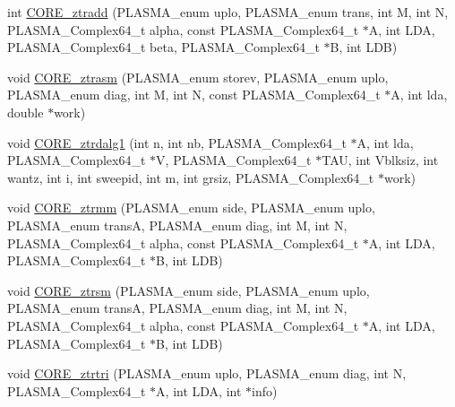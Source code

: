 \begin{DoxyCompactItemize}
\item 
int \hyperlink{group__CORE__PLASMA__Complex64__t_ga12adea0eb1121a4d2c668f344fc7aeca_ga12adea0eb1121a4d2c668f344fc7aeca}{C\+O\+R\+E\+\_\+ztradd} (P\+L\+A\+S\+M\+A\+\_\+enum uplo, P\+L\+A\+S\+M\+A\+\_\+enum trans, int M, int N, P\+L\+A\+S\+M\+A\+\_\+\+Complex64\+\_\+t alpha, const P\+L\+A\+S\+M\+A\+\_\+\+Complex64\+\_\+t $\ast$A, int L\+D\+A, P\+L\+A\+S\+M\+A\+\_\+\+Complex64\+\_\+t beta, P\+L\+A\+S\+M\+A\+\_\+\+Complex64\+\_\+t $\ast$B, int L\+D\+B)
\item 
void \hyperlink{group__CORE__PLASMA__Complex64__t_ga2d04c482383fc87daa3da97d2407f31a_ga2d04c482383fc87daa3da97d2407f31a}{C\+O\+R\+E\+\_\+ztrasm} (P\+L\+A\+S\+M\+A\+\_\+enum storev, P\+L\+A\+S\+M\+A\+\_\+enum uplo, P\+L\+A\+S\+M\+A\+\_\+enum diag, int M, int N, const P\+L\+A\+S\+M\+A\+\_\+\+Complex64\+\_\+t $\ast$A, int lda, double $\ast$work)
\item 
void \hyperlink{group__CORE__PLASMA__Complex64__t_ga480ae84e836404a6e258922643414be5_ga480ae84e836404a6e258922643414be5}{C\+O\+R\+E\+\_\+ztrdalg1} (int n, int nb, P\+L\+A\+S\+M\+A\+\_\+\+Complex64\+\_\+t $\ast$A, int lda, P\+L\+A\+S\+M\+A\+\_\+\+Complex64\+\_\+t $\ast$V, P\+L\+A\+S\+M\+A\+\_\+\+Complex64\+\_\+t $\ast$T\+A\+U, int Vblksiz, int wantz, int i, int sweepid, int m, int grsiz, P\+L\+A\+S\+M\+A\+\_\+\+Complex64\+\_\+t $\ast$work)
\item 
void \hyperlink{group__CORE__PLASMA__Complex64__t_ga6eb8b077081e02298f22253a2cf0c02b_ga6eb8b077081e02298f22253a2cf0c02b}{C\+O\+R\+E\+\_\+ztrmm} (P\+L\+A\+S\+M\+A\+\_\+enum side, P\+L\+A\+S\+M\+A\+\_\+enum uplo, P\+L\+A\+S\+M\+A\+\_\+enum trans\+A, P\+L\+A\+S\+M\+A\+\_\+enum diag, int M, int N, P\+L\+A\+S\+M\+A\+\_\+\+Complex64\+\_\+t alpha, const P\+L\+A\+S\+M\+A\+\_\+\+Complex64\+\_\+t $\ast$A, int L\+D\+A, P\+L\+A\+S\+M\+A\+\_\+\+Complex64\+\_\+t $\ast$B, int L\+D\+B)
\item 
void \hyperlink{group__CORE__PLASMA__Complex64__t_ga8269605b25f1f4a507ed70fb70e0561a_ga8269605b25f1f4a507ed70fb70e0561a}{C\+O\+R\+E\+\_\+ztrsm} (P\+L\+A\+S\+M\+A\+\_\+enum side, P\+L\+A\+S\+M\+A\+\_\+enum uplo, P\+L\+A\+S\+M\+A\+\_\+enum trans\+A, P\+L\+A\+S\+M\+A\+\_\+enum diag, int M, int N, P\+L\+A\+S\+M\+A\+\_\+\+Complex64\+\_\+t alpha, const P\+L\+A\+S\+M\+A\+\_\+\+Complex64\+\_\+t $\ast$A, int L\+D\+A, P\+L\+A\+S\+M\+A\+\_\+\+Complex64\+\_\+t $\ast$B, int L\+D\+B)
\item 
void \hyperlink{group__CORE__PLASMA__Complex64__t_ga6ea1efa9b00f1d2a2db1dea3d5302c33_ga6ea1efa9b00f1d2a2db1dea3d5302c33}{C\+O\+R\+E\+\_\+ztrtri} (P\+L\+A\+S\+M\+A\+\_\+enum uplo, P\+L\+A\+S\+M\+A\+\_\+enum diag, int N, P\+L\+A\+S\+M\+A\+\_\+\+Complex64\+\_\+t $\ast$A, int L\+D\+A, int $\ast$info)

\end{DoxyCompactItemize}
